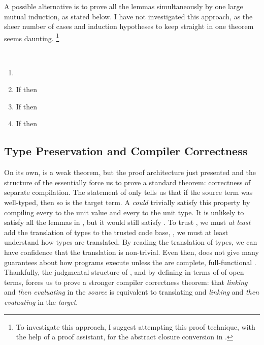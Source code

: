 A possible alternative is to prove all the lemmas simultaneously by one large
mutual induction, as stated below.
I have not investigated this approach, as the sheer number of cases and
induction hypotheses to keep straight in one theorem seems daunting.
\footnote{To investigate this approach, I suggest attempting this proof
  technique, with the help of a proof assistant, for the abstract closure
  conversion in .}
\begin{conjecture}
  ~
  \begin{enumerate}
    \item \im{\tequivjudg{\sembrace{\slenv}}{\sembrace{\subst{\se}{\sepr}{\sx}}}{\subst{\sembrace{\se}}{\sembrace{\sepr}}{\tx}}}
    \item If \im{\sequivjudg{\slenv}{\se}{\sepr}} then \im{\tequivjudg{\sembrace{\slenv}}{\sembrace{\se}}{\sembrace{\sepr}}}
    \item If \im{\swf{\slenv}} then \im{\twf{\sembrace{\slenv}}}
    \item If \im{\styjudg{\slenv}{\se}{\sA}} then \im{\ttyjudg{\sembrace{\slenv}}{\sembrace{\se}}{\sembrace{\sA}}}
  \end{enumerate}
\end{conjecture}

\subsection{Type Preservation and Compiler Correctness}
\label{sec:type-pres:correct}
On its own,  is a weak theorem, but the proof
architecture just presented and the structure of the 
essentially force us to prove a standard  theorem:
correctness of separate compilation.
The statement of  only tells us that if the
source term was well-typed, then so is the target term.
A  \emph{could} trivially satisfy this property by compiling
every  to the unit value and every  to the unit type.
It is unlikely to satisfy all the lemmas in
, but it would still satisfy
.
To trust , we must \emph{at least} add the
translation of types to the trusted code base, \ie, we must at least understand
how types are translated.
By reading the translation of types, we can have confidence that the translation
is non-trivial.
Even then,  does not give many guarantees about how
programs execute unless the  are complete, full-functional
.
Thankfully, the judgmental structure of , and by defining
 in terms of  of open terms,  forces us to prove a stronger compiler correctness theorem: that
\emph{linking} and \emph{then evaluating} in the \emph{source} is equivalent to
translating and \emph{linking} and \emph{then evaluating} in the \emph{target}.

